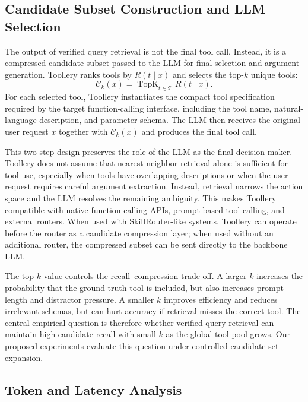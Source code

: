 \documentclass[11pt]{article}
\begin{document}
\subsection{Candidate Subset Construction and LLM Selection}
\label{subsec:candidate_subset}

The output of verified query retrieval is not the final tool call. Instead, it is a compressed candidate subset passed to the LLM for final selection and argument generation. Toollery ranks tools by $R(t \mid x)$ and selects the top-$k$ unique tools:
\begin{equation}
    \mathcal{C}_k(x) = \operatorname{TopK}_{t \in \mathcal{T}} R(t \mid x).
\end{equation}
For each selected tool, Toollery instantiates the compact tool specification required by the target function-calling interface, including the tool name, natural-language description, and parameter schema. The LLM then receives the original user request $x$ together with $\mathcal{C}_k(x)$ and produces the final tool call.

This two-step design preserves the role of the LLM as the final decision-maker. Toollery does not assume that nearest-neighbor retrieval alone is sufficient for tool use, especially when tools have overlapping descriptions or when the user request requires careful argument extraction. Instead, retrieval narrows the action space and the LLM resolves the remaining ambiguity. This makes Toollery compatible with native function-calling APIs, prompt-based tool calling, and external routers. When used with SkillRouter-like systems, Toollery can operate before the router as a candidate compression layer; when used without an additional router, the compressed subset can be sent directly to the backbone LLM.

The top-$k$ value controls the recall--compression trade-off. A larger $k$ increases the probability that the ground-truth tool is included, but also increases prompt length and distractor pressure. A smaller $k$ improves efficiency and reduces irrelevant schemas, but can hurt accuracy if retrieval misses the correct tool. The central empirical question is therefore whether verified query retrieval can maintain high candidate recall with small $k$ as the global tool pool grows. Our proposed experiments evaluate this question under controlled candidate-set expansion.

\subsection{Token and Latency Analysis}
\label{subsec:token_latency}
\end{document}
